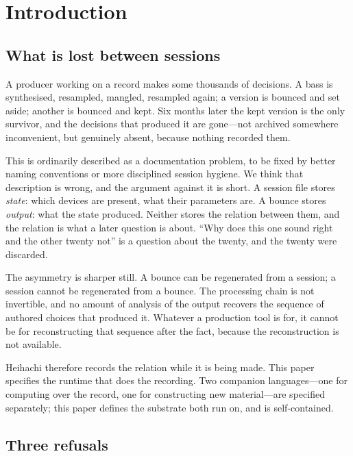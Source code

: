 \documentclass[11pt,twocolumn,a4paper]{article}
\theoremstyle{definition}
\theoremstyle{remark}
\begin{document}
\section{Introduction}
\label{sec:intro}

\subsection{What is lost between sessions}

A producer working on a record makes some thousands of decisions. A bass is
synthesised, resampled, mangled, resampled again; a version is bounced and set
aside; another is bounced and kept. Six months later the kept version is the only
survivor, and the decisions that produced it are gone---not archived somewhere
inconvenient, but genuinely absent, because nothing recorded them.

This is ordinarily described as a documentation problem, to be fixed by better
naming conventions or more disciplined session hygiene. We think that
description is wrong, and the argument against it is short. A session file stores
\emph{state}: which devices are present, what their parameters are. A bounce
stores \emph{output}: what the state produced. Neither stores the relation between
them, and the relation is what a later question is about. ``Why does this one
sound right and the other twenty not'' is a question about the twenty, and the
twenty were discarded.

The asymmetry is sharper still. A bounce can be regenerated from a session; a
session cannot be regenerated from a bounce. The processing chain is not
invertible, and no amount of analysis of the output recovers the sequence of
authored choices that produced it. Whatever a production tool is for, it cannot
be for reconstructing that sequence after the fact, because the reconstruction is
not available.

Heihachi therefore records the relation while it is being made. This paper
specifies the runtime that does the recording. Two companion languages---one for
computing over the record, one for constructing new material---are specified
separately; this paper defines the substrate both run on, and is self-contained.

\subsection{Three refusals}
\end{document}
